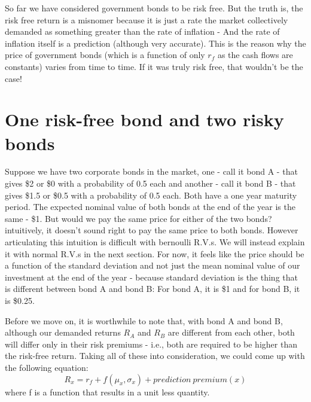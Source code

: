 So far we have considered government bonds to be risk free. But the truth is, the risk free return is a misnomer because it is just a rate the market collectively demanded as something greater than the rate of inflation - And the rate of inflation itself is a prediction (although very accurate). This is the reason why the price of government bonds (which is a function of only \(r_f\) as the cash flows are constants) varies from time to time. If it was truly risk free, that wouldn't be the case!

\section{One risk-free bond and two risky bonds}
Suppose we have two corporate bonds in the market, one - call it bond A - that gives \$2 or \$0 with a probability of 0.5 each and another - call it bond B - that gives \$1.5 or \$0.5 with a probability of 0.5 each. Both have a one year maturity period. The expected nominal value of both bonds at the end of the year is the same - \$1. But would we pay the same price for either of the two bonds? intuitively, it doesn't sound right to pay the same price to both bonds. However articulating this intuition is difficult with bernoulli R.V.s. We will instead explain it with normal R.V.s in the next section. For now, it feels like the price should be a function of the standard deviation and not just the mean nominal value of our investment at the end of the year - because standard deviation is the thing that is different between bond A and bond B: For bond A, it is \$1 and for bond B, it is \$0.25.

Before we move on, it is worthwhile to note that, with bond A and bond B, although our demanded returns \(R_A\) and \(R_B\) are different from each other, both will differ only in their risk premiums - i.e., both are required to be higher than the risk-free return. Taking all of these into consideration, we could come up with the following equation:
	\[ R_x = r_f + f(\mu_x, \sigma_x) + prediction\ premium(x) \]
where f is a function that results in a unit less quantity.

